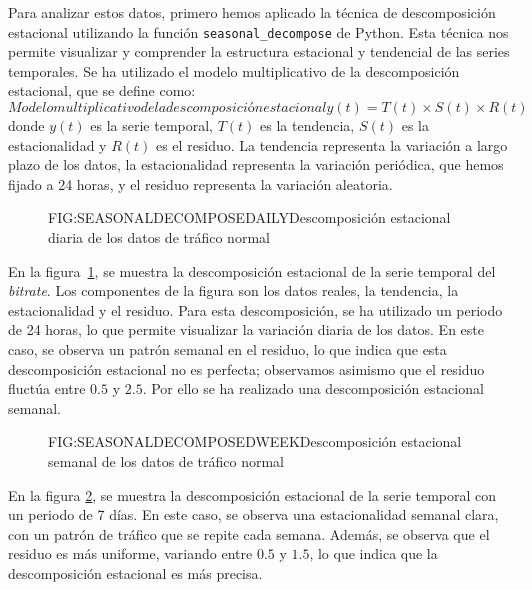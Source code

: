 Para analizar estos datos, primero hemos aplicado la técnica de descomposición estacional utilizando la función \texttt{seasonal\_decompose} de Python. Esta técnica nos permite visualizar y comprender la estructura estacional y tendencial de las series temporales. Se ha utilizado el modelo multiplicativo de la descomposición estacional, que se define como:
\begin{equation}{Modelo multiplicativo de
la descomposición estacional}
    y(t)= T(t) \times S(t) \times R(t)
\end{equation}
donde $y(t)$ es la serie temporal, $T(t)$ es la tendencia, $S(t)$ es la estacionalidad y $R(t)$ es el residuo. La tendencia representa la variación a largo plazo de los datos, la estacionalidad representa la variación periódica, que hemos fijado a 24 horas, y el residuo representa la variación aleatoria.

\begin{figure}[Descomposición estacional diaria de los datos de tráfico normal]{FIG:SEASONALDECOMPOSEDAILY}{Descomposición estacional diaria de los datos de tráfico normal}
    \label{FIG:SEASONALDECOMPOSEDAILY}
\end{figure}

En la figura~\ref{FIG:SEASONALDECOMPOSEDAILY}, se muestra la descomposición estacional de la serie temporal del \textit{bitrate}. Los componentes de la figura son los datos reales, la tendencia, la estacionalidad y el residuo. Para esta descomposición, se ha utilizado un periodo de 24 horas, lo que permite visualizar la variación diaria de los datos. En este caso, se observa un patrón semanal en el residuo, lo que indica que esta descomposición estacional no es perfecta; observamos asimismo que el residuo fluctúa entre $0.5$ y $2.5$. Por ello se ha realizado una descomposición estacional semanal.

\begin{figure}[Descomposición estacional semanal de los datos de tráfico normal]{FIG:SEASONALDECOMPOSEDWEEK}{Descomposición estacional semanal de los datos de tráfico normal}
    \label{FIG:SEASONALDECOMPOSEDWEEK}
\end{figure}

En la figura \ref{FIG:SEASONALDECOMPOSEDWEEK}, se muestra la descomposición estacional de la serie temporal con un periodo de 7 días. En este caso, se observa una estacionalidad semanal clara, con un patrón de tráfico que se repite cada semana. Además, se observa que el residuo es más uniforme, variando entre $0.5$ y $1.5$, lo que indica que la descomposición estacional es más precisa.

